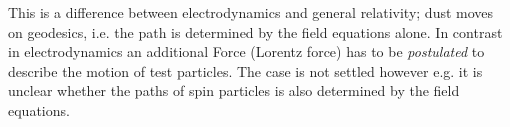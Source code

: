\begin{remark}
This is a difference between electrodynamics and general relativity; dust moves
on geodesics, i.e. the path is determined by the field equations alone. In contrast
in electrodynamics an additional Force (Lorentz force) has to be
\emph{postulated} to describe the motion of test particles. The case is not
settled however e.g. it is unclear whether the paths of spin particles is also
determined by the field equations.
\end{remark}